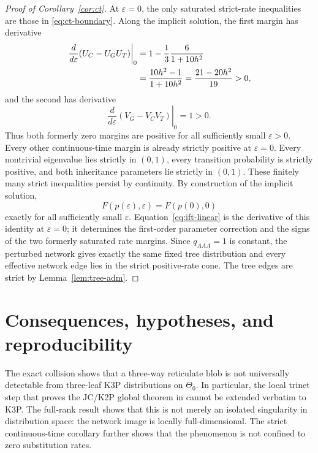 \documentclass[11pt]{article}
\theoremstyle{remark}
\newcommand{\ThetaZero}{\Theta_{0}}
\begin{document}
\begin{proof}[Proof of Corollary~\ref{cor:ct}]
At $\varepsilon=0$, the only saturated strict-rate inequalities are those in \eqref{eq:ct-boundary}.  Along the implicit solution, the first margin has derivative
\begin{align}
 \left.\frac{d}{d\varepsilon}
 (U_C-U_GU_T)\right|_{0}
 &=1-\frac13\frac{6}{1+10h^2}\notag\\
 &=\frac{10h^2-1}{1+10h^2}
 =\frac{21-20h^2}{19}>0,
 \label{eq:U-margin-der}
\end{align}
and the second has derivative
\begin{equation}\label{eq:V-margin-der}
 \left.\frac{d}{d\varepsilon}
 (V_G-V_CV_T)\right|_{0}=1>0.
\end{equation}
Thus both formerly zero margins are positive for all sufficiently small $\varepsilon>0$.  Every other continuous-time margin is already strictly positive at $\varepsilon=0$.  Every nontrivial eigenvalue lies strictly in $(0,1)$, every transition probability is strictly positive, and both inheritance parameters lie strictly in $(0,1)$.  These finitely many strict inequalities persist by continuity.  By construction of the implicit solution,
\[
  F(p(\varepsilon),\varepsilon)=F(p(0),0)
\]
exactly for all sufficiently small $\varepsilon$.  Equation~\eqref{eq:ift-linear} is the derivative of this identity at $\varepsilon=0$; it determines the first-order parameter correction and the signs of the two formerly saturated rate margins.  Since $q_{AAA}=1$ is constant, the perturbed network gives exactly the same fixed tree distribution and every effective network edge lies in the strict positive-rate cone.  The tree edges are strict by Lemma~\ref{lem:tree-adm}.
\end{proof}

\section{Consequences, hypotheses, and reproducibility}

The exact collision shows that a three-way reticulate blob is not universally detectable from three-leaf K3P distributions on $\ThetaZero$.  In particular, the local trinet step that proves the JC/K2P global theorem in \cite{BritsHoltgrefeVanIerselMartin2026} cannot be extended verbatim to K3P.  The full-rank result shows that this is not merely an isolated singularity in distribution space: the network image is locally full-dimensional.  The strict continuous-time corollary further shows that the phenomenon is not confined to zero substitution rates.
\end{document}
